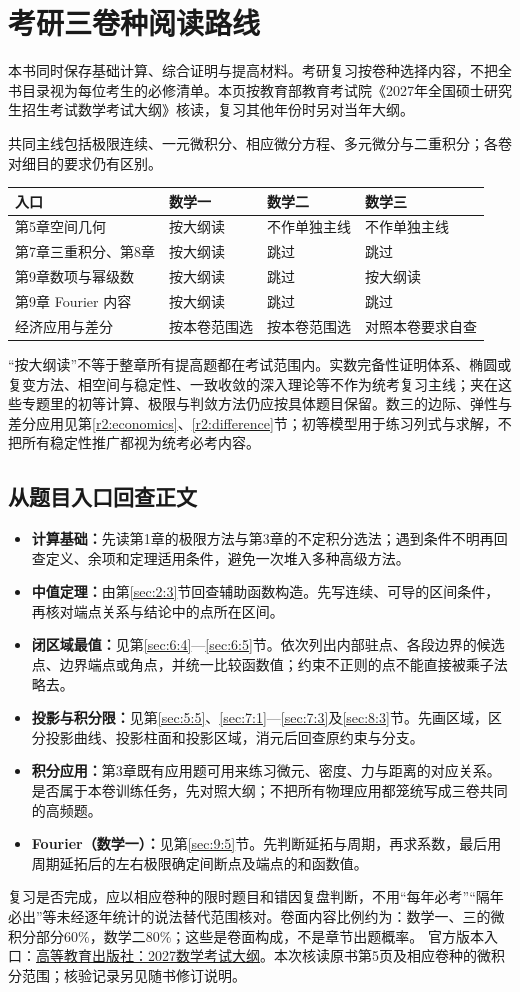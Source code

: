 \chapter*{考研三卷种阅读路线}
本书同时保存基础计算、综合证明与提高材料。考研复习按卷种选择内容，不把全书目录视为每位考生的必修清单。本页按教育部教育考试院《2027年全国硕士研究生招生考试数学考试大纲》核读，复习其他年份时另对当年大纲。

共同主线包括极限连续、一元微积分、相应微分方程、多元微分与二重积分；各卷对细目的要求仍有区别。
\begin{center}
\begin{tabularx}{\textwidth}{@{}p{}XXX@{}}
\toprule 入口&数学一&数学二&数学三\\\midrule
第5章空间几何&按大纲读&不作单独主线&不作单独主线\\
第7章三重积分、第8章&按大纲读&跳过&跳过\\
第9章数项与幂级数&按大纲读&跳过&按大纲读\\
第9章 Fourier 内容&按大纲读&跳过&跳过\\
经济应用与差分&按本卷范围选&按本卷范围选&对照本卷要求自查\\
\bottomrule
\end{tabularx}
\end{center}

“按大纲读”不等于整章所有提高题都在考试范围内。实数完备性证明体系、椭圆或复变方法、相空间与稳定性、一致收敛的深入理论等不作为统考复习主线；夹在这些专题里的初等计算、极限与判敛方法仍应按具体题目保留。数三的边际、弹性与差分应用见第\ref{r2:economics}、\ref{r2:difference}节；初等模型用于练习列式与求解，不把所有稳定性推广都视为统考必考内容。

\section*{从题目入口回查正文}
\begin{itemize}
\item \textbf{计算基础：}先读第1章的极限方法与第3章的不定积分选法；遇到条件不明再回查定义、余项和定理适用条件，避免一次堆入多种高级方法。
\item \textbf{中值定理：}由第\ref{sec:2:3}节回查辅助函数构造。先写连续、可导的区间条件，再核对端点关系与结论中的点所在区间。
\item \textbf{闭区域最值：}见第\ref{sec:6:4}—\ref{sec:6:5}节。依次列出内部驻点、各段边界的候选点、边界端点或角点，并统一比较函数值；约束不正则的点不能直接被乘子法略去。
\item \textbf{投影与积分限：}见第\ref{sec:5:5}、\ref{sec:7:1}—\ref{sec:7:3}及\ref{sec:8:3}节。先画区域，区分投影曲线、投影柱面和投影区域，消元后回查原约束与分支。
\item \textbf{积分应用：}第3章既有应用题可用来练习微元、密度、力与距离的对应关系。是否属于本卷训练任务，先对照大纲；不把所有物理应用都笼统写成三卷共同的高频题。
\item \textbf{Fourier（数学一）：}见第\ref{sec:9:5}节。先判断延拓与周期，再求系数，最后用周期延拓后的左右极限确定间断点及端点的和函数值。
\end{itemize}

复习是否完成，应以相应卷种的限时题目和错因复盘判断，不用“每年必考”“隔年必出”等未经逐年统计的说法替代范围核对。卷面内容比例约为：数学一、三的微积分部分60\%，数学二80\%；这些是卷面构成，不是章节出题概率。
官方版本入口：\href{https://xuanshu.hep.com.cn/front/book/findBookDetails?bookId=6aa1910be119ac97297a608f}{高等教育出版社：2027数学考试大纲}。本次核读原书第5页及相应卷种的微积分范围；核验记录另见随书修订说明。
